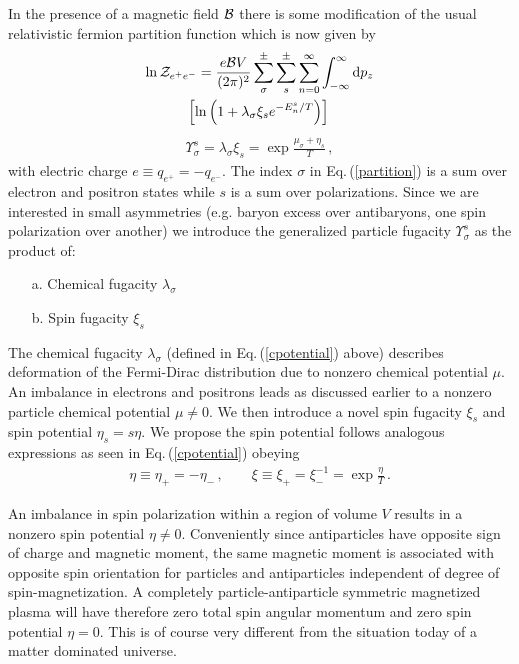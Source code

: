 \documentclass[reprint]{revtex4-2}
\newcommand{\req}[1]{Eq.\,(\ref{#1})}
\begin{document}
In the presence of a magnetic field ${\cal B}$ there is some modification of the usual relativistic fermion partition function which is now given  by
\begin{multline}
    \label{partition}
    \ln{\cal Z}_{e^{+}e^{-}}=\frac{e{\cal B}V}{(2\pi)^{2}}\sum_{\sigma}^{\pm}\sum_{s}^{\pm}\sum_{n=0}^{\infty}\int_{-\infty}^{\infty}{\rm d}p_{z}\\
    \left[\ln\left(1+\lambda_{\sigma}\xi_{s}e^{-E_{n}^{s}/T}\right)\right]\,
\end{multline}
\begin{align}
    \Upsilon_{\sigma}^{s}=\lambda_{\sigma}\xi_{s} = \exp{\frac{\mu_{\sigma}+\eta_{s}}{T}}\,,
\end{align}
with electric charge $e\equiv q_{e^{+}}=-q_{e^{-}}$. The index $\sigma$ in \req{partition} is a sum over electron and positron states while $s$ is a sum over polarizations. Since we are interested in small asymmetries (e.g. baryon excess over antibaryons, one spin polarization over another) we introduce the generalized particle fugacity $\Upsilon_{\sigma}^{s}$ as the product of:
\begin{itemize}
    \item[a.] Chemical fugacity $\lambda_{\sigma}$
    \item[b.] Spin fugacity $\xi_{s}$
\end{itemize}
The chemical fugacity $\lambda_{\sigma}$ (defined in \req{cpotential} above) describes deformation of the Fermi-Dirac distribution due to nonzero chemical potential $\mu$. An imbalance in electrons and positrons leads as discussed earlier to a nonzero particle chemical potential $\mu\neq0$. We then introduce a novel spin fugacity $\xi_{s}$ and spin potential $\eta_{s}=s\eta$. We propose the spin potential follows analogous expressions as seen in \req{cpotential} obeying
\begin{align}
    \label{spotential}
    \eta\equiv\eta_{+}=-\eta_{-}\,,\qquad
    \xi\equiv\xi_{+}=\xi_{-}^{-1}= \exp{\frac{\eta}{T}}\,.
\end{align}

An imbalance in spin polarization within a region of volume $V$ results in a nonzero spin potential $\eta\neq0$. Conveniently since antiparticles have opposite sign of charge and magnetic moment, the same magnetic moment is associated with opposite spin orientation for particles and antiparticles independent of degree of spin-magnetization. A completely particle-antiparticle symmetric magnetized plasma will have therefore zero total spin angular momentum and zero spin potential $\eta=0$. This is of course very different from the situation today of a matter dominated universe.
\end{document}
